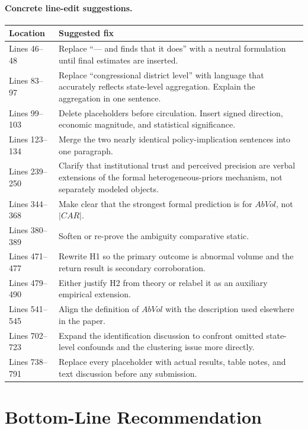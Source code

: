 \documentclass[12pt]{article}
\begin{document}
\paragraph{Concrete line-edit suggestions.}

\begin{longtable}{p{} p{}}
\toprule
\textbf{Location} & \textbf{Suggested fix} \\
\midrule
Lines 46--48 & Replace ``--- and finds that it does'' with a neutral formulation until final estimates are inserted. \\
Lines 83--97 & Replace ``congressional district level'' with language that accurately reflects state-level aggregation. Explain the aggregation in one sentence. \\
Lines 99--103 & Delete placeholders before circulation. Insert signed direction, economic magnitude, and statistical significance. \\
Lines 123--134 & Merge the two nearly identical policy-implication sentences into one paragraph. \\
Lines 239--250 & Clarify that institutional trust and perceived precision are verbal extensions of the formal heterogeneous-priors mechanism, not separately modeled objects. \\
Lines 344--368 & Make clear that the strongest formal prediction is for $AbVol$, not $|CAR|$. \\
Lines 380--389 & Soften or re-prove the ambiguity comparative static. \\
Lines 471--477 & Rewrite H1 so the primary outcome is abnormal volume and the return result is secondary corroboration. \\
Lines 479--490 & Either justify H2 from theory or relabel it as an auxiliary empirical extension. \\
Lines 541--545 & Align the definition of $AbVol$ with the description used elsewhere in the paper. \\
Lines 702--723 & Expand the identification discussion to confront omitted state-level confounds and the clustering issue more directly. \\
Lines 738--791 & Replace every placeholder with actual results, table notes, and text discussion before any submission. \\
\bottomrule
\end{longtable}

\section*{Bottom-Line Recommendation}
\end{document}
